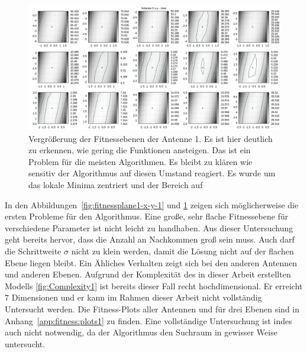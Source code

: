 \begin{figure}[ht!]
  \caption[Fitness Ebenen Heatmap, vergrößert]{Vergrößerung der Fitnessebenen der Antenne 1. Es ist hier deutlich zu erkennen, wie gering die Funktionen ansteigen. Das ist ein Problem für die meisten Algorithmen. Es bleibt zu klären wie sensitiv der Algorithmus auf diesen Umstand reagiert. Es wurde um das lokale Minima zentriert und der Bereich auf}
  \begin{center}
   \includegraphics[width=\textwidth]{img/fitness/xy_a0zoomed.png}
  \end{center}
  \label{fig:fitnessplane1-x-y-zoom-1}
%
\end{figure}
%
In den Abbildungen~\ref{fig:fitnessplane1-x-y-1} und \ref{fig:fitnessplane1-x-y-zoom-1} zeigen sich möglicherweise die ersten Probleme für den Algorithmus. Eine große, sehr flache Fitnessebene für verschiedene Parameter ist nicht leicht zu handhaben. Aus dieser Untersuchung geht bereits hervor, dass die Anzahl an Nachkommen groß sein muss. Auch darf die Schrittweite $\sigma$ nicht zu klein werden, damit die Lösung nicht auf der flachen Ebene liegen bleibt. Ein Ähliches Verhalten zeigt sich bei den anderen Antennen und anderen Ebenen. Aufgrund der Komplexität des in dieser Arbeit erstellten Modells \ref{fig:Complexity1} ist bereits dieser Fall recht hochdimensional. Er erreicht $7$ Dimensionen und er kann im Rahmen dieser Arbeit nicht vollständig Untersucht werden. Die Fitness-Plots aller Antennen und für drei Ebenen sind in Anhang~\ref{app:fitness:plots1} zu finden. Eine vollständige Untersuchung ist indes auch nicht notwendig, da der Algorithmus den Suchraum in gewisser Weise untersucht. 
%
